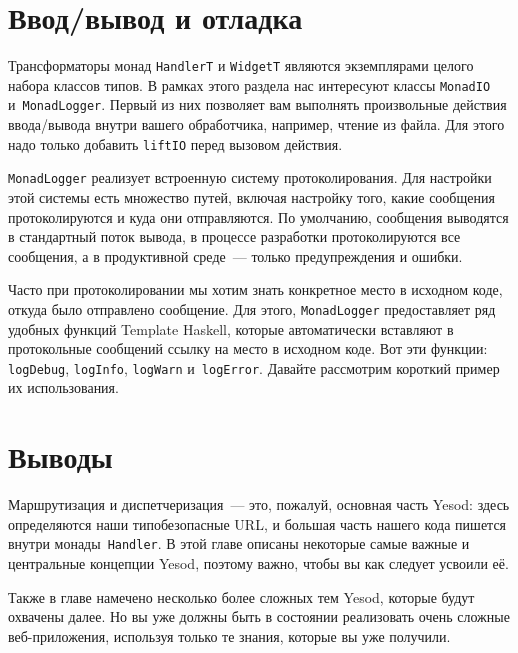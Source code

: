 \section{Ввод/вывод и отладка}
Трансформаторы монад \lstinline'HandlerT' и \lstinline'WidgetT' являются
экземплярами целого набора классов типов. В рамках этого раздела нас интересуют
классы \lstinline'MonadIO' и~\lstinline'MonadLogger'. Первый из них позволяет
вам выполнять произвольные действия ввода/вывода внутри вашего обработчика,
например, чтение из файла. Для этого надо только добавить \lstinline'liftIO'
перед вызовом действия.

\lstinline'MonadLogger' реализует встроенную систему протоколирования. Для
настройки этой системы есть множество путей, включая настройку того, какие
сообщения протоколируются и куда они отправляются. По умолчанию, сообщения
выводятся в стандартный поток вывода, в процессе разработки протоколируются все
сообщения, а в продуктивной среде~--- только предупреждения и ошибки.

Часто при протоколировании мы хотим знать конкретное место в исходном коде,
откуда было отправлено сообщение. Для этого, \lstinline'MonadLogger'
предоставляет ряд удобных функций Template Haskell, которые автоматически
вставляют в протокольные сообщений ссылку на место в исходном коде. Вот эти
функции: \lstinline'logDebug', \lstinline'logInfo', \lstinline'logWarn'
и~\lstinline'logError'. Давайте рассмотрим короткий пример их использования.


\section{Выводы}
Маршрутизация и диспетчеризация~--- это, пожалуй, основная часть Yesod: здесь
определяются наши типобезопасные URL, и большая часть нашего кода
пишется внутри монады~\lstinline!Handler!. В этой главе описаны
некоторые самые важные и центральные концепции Yesod, поэтому важно,
чтобы вы как следует усвоили её.

Также в главе намечено несколько более сложных тем Yesod, которые
будут охвачены далее. Но вы уже должны быть в состоянии реализовать
очень сложные веб-приложения, используя только те знания,
которые вы уже получили.
